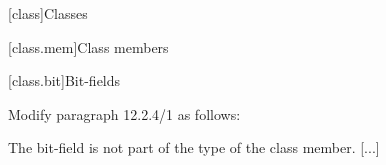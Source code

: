 \setcounter{chapter}{11}
[class]{Classes}

\setcounter{section}{1}
[class.mem]{Class members}

\setcounter{subsection}{3}
[class.bit]{Bit-fields}

Modify paragraph 12.2.4/1 as follows:
\begin{std.txt}
    \resetalinea[0]
    \alinea
    [...] The bit-field  is not part of 
    the type of the class member. [...]
\end{std.txt}